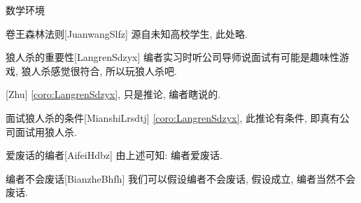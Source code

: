 \documentclass[hyperref, UTF8, CJK, aspectratio=169]{beamer}
\begin{document}
\begin{frame}{数学环境}
\begin{bitlemma}{卷王森林法则}[JuanwangSlfz]
		源自未知高校学生, 此处略.
	\end{bitlemma}
	\begin{bitcorollary}{狼人杀的重要性}[LangrenSdzyx]
		编者实习时听公司导师说面试有可能是趣味性游戏, 狼人杀感觉很符合, 所以玩狼人杀吧.
	\end{bitcorollary}
	\begin{bitremark}{}[Zhu]
		\vref{coro:LangrenSdzyx}, 只是推论, 编者瞎说的.
	\end{bitremark}
	\begin{bitcondition}{面试狼人杀的条件}[MianshiLrsdtj]
		\vref{coro:LangrenSdzyx}, 此推论有条件, 即真有公司面试用狼人杀.
	\end{bitcondition}
	\begin{bitconclusion}{爱废话的编者}[AifeiHdbz]
		由上述可知: 编者爱废话.
	\end{bitconclusion}
	\begin{bitassumption}{编者不会废话}[BianzheBhfh]
		我们可以假设编者不会废话, 假设成立, 编者当然不会废话.
	\end{bitassumption}
\end{frame}
\end{document}
